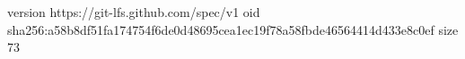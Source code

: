 version https://git-lfs.github.com/spec/v1
oid sha256:a58b8df51fa174754f6de0d48695cea1ec19f78a58fbde46564414d433e8c0ef
size 73
